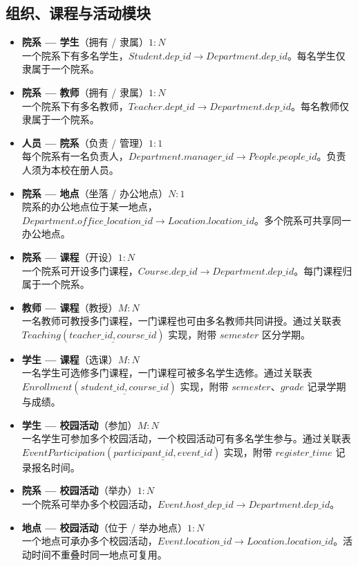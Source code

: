 \documentclass[11pt, a4paper]{article}
\begin{document}
\subsection{组织、课程与活动模块}
\begin{itemize}
    \item \textbf{院系 --- 学生}（拥有 / 隶属）\quad $1{:}N$\\
    一个院系下有多名学生，$Student.dep\_id \rightarrow Department.dep\_id$。每名学生仅隶属于一个院系。
    \item \textbf{院系 --- 教师}（拥有 / 隶属）\quad $1{:}N$\\
    一个院系下有多名教师，$Teacher.dept\_id \rightarrow Department.dep\_id$。每名教师仅隶属于一个院系。
    \item \textbf{人员 --- 院系}（负责 / 管理）\quad $1{:}1$\\
    每个院系有一名负责人，$Department.manager\_id \rightarrow People.people\_id$。负责人须为本校在册人员。
    \item \textbf{院系 --- 地点}（坐落 / 办公地点）\quad $N{:}1$\\
    院系的办公地点位于某一地点，$Department.office\_location\_id \rightarrow Location.location\_id$。多个院系可共享同一办公地点。
    \item \textbf{院系 --- 课程}（开设）\quad $1{:}N$\\
    一个院系可开设多门课程，$Course.dep\_id \rightarrow Department.dep\_id$。每门课程归属于一个院系。
    \item \textbf{教师 --- 课程}（教授）\quad $M{:}N$\\
    一名教师可教授多门课程，一门课程也可由多名教师共同讲授。通过关联表 $Teaching(\underline{teacher\_id, course\_id})$ 实现，附带 $semester$ 区分学期。
    \item \textbf{学生 --- 课程}（选课）\quad $M{:}N$\\
    一名学生可选修多门课程，一门课程可被多名学生选修。通过关联表 $Enrollment(\underline{student\_id, course\_id})$ 实现，附带 $semester$、$grade$ 记录学期与成绩。
    \item \textbf{学生 --- 校园活动}（参加）\quad $M{:}N$\\
    一名学生可参加多个校园活动，一个校园活动可有多名学生参与。通过关联表 $EventParticipation(\underline{participant\_id, event\_id})$ 实现，附带 $register\_time$ 记录报名时间。
    \item \textbf{院系 --- 校园活动}（举办）\quad $1{:}N$\\
    一个院系可举办多个校园活动，$Event.host\_dep\_id \rightarrow Department.dep\_id$。
    \item \textbf{地点 --- 校园活动}（位于 / 举办地点）\quad $1{:}N$\\
    一个地点可承办多个校园活动，$Event.location\_id \rightarrow Location.location\_id$。活动时间不重叠时同一地点可复用。
\end{itemize}
\end{document}
